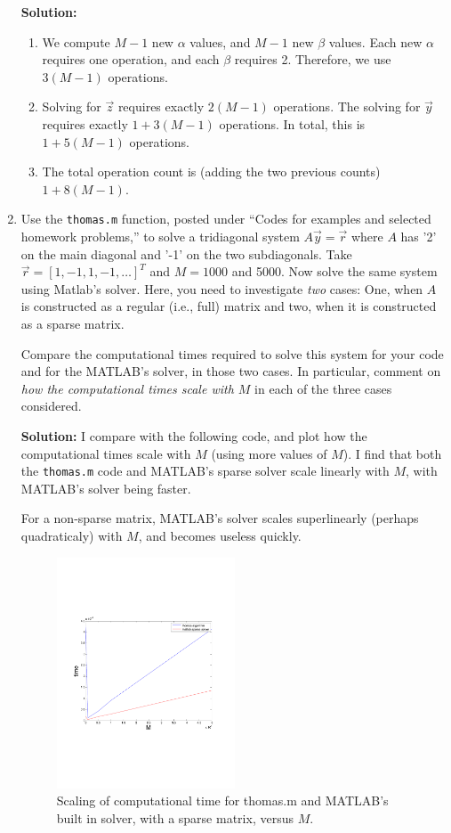 \documentclass[11pt]{article}
\begin{document}
\begin{enumerate}
\bigskip
\textbf{Solution:} 
\begin{enumerate}
\item We compute $M-1$ new $\alpha$ values, and $M-1$ new $\beta$ values.
Each new $\alpha$ requires one operation, and each $\beta$ requires 2.
Therefore, we use $3(M-1)$ operations.
\item Solving for $\vec{z}$ requires exactly $2(M-1)$ operations.
The solving for $\vec{y}$ requires exactly $1+3(M-1)$ operations.
In total, this is $1+5(M-1)$ operations.
\item The total operation count is (adding the two previous counts) $1+8(M-1)$.
\end{enumerate}

\item Use the \verb|thomas.m| function, posted under ``Codes for examples and selected homework problems,'' to solve a tridiagonal system $A\vec{y} = \vec{r}$ where $A$ has '2' on the main diagonal and '-1' on the two subdiagonals.
Take $\vec{r} = [1,-1,1,-1,\ldots]^T$ and $M = 1000$ and 5000.
Now solve the same system using Matlab's solver.
Here, you need to investigate {\em two} cases: One, when $A$ is constructed as a regular (i.e., full) matrix and two, when it is constructed as a sparse matrix.

Compare the computational times required to solve this system for your code and for the MATLAB's solver, in those two cases.
In particular, comment on {\em how the computational times scale with $M$} in each of the three cases considered.

\bigskip
\textbf{Solution:} I compare with the following code, and plot how the computational times scale with $M$ (using more values of $M$).
I find that both the \verb|thomas.m| code and MATLAB's sparse solver scale linearly with $M$, with MATLAB's solver being faster.

For a non-sparse matrix, MATLAB's solver scales superlinearly (perhaps quadraticaly) with $M$, and becomes useless quickly.



\begin{figure}[h!]
  \centering
    \includegraphics[width=0.5\textwidth]{andy_hw08_prb04_01.pdf}
  \caption{Scaling of computational time for thomas.m and MATLAB's built in solver, with a sparse matrix, versus $M$.}
\end{figure}


\end{enumerate}
\end{document}

